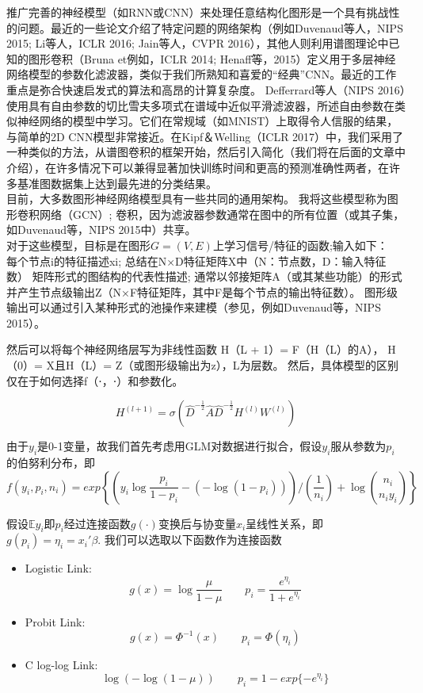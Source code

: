 \documentclass[a4paper,UTF8]{article}
\begin{document}
推广完善的神经模型（如RNN或CNN）来处理任意结构化图形是一个具有挑战性的问题。最近的一些论文介绍了特定问题的网络架构（例如Duvenaud等人，NIPS 2015; Li等人，ICLR 2016; Jain等人，CVPR 2016），其他人则利用谱图理论中已知的图形卷积（Bruna et例如，ICLR 2014; Henaff等，2015）定义用于多层神经网络模型的参数化滤波器，类似于我们所熟知和喜爱的“经典”CNN。最近的工作重点是弥合快速启发式的算法和高昂的计算复杂度。 Defferrard等人（NIPS 2016）使用具有自由参数的切比雪夫多项式在谱域中近似平滑滤波器，所述自由参数在类似神经网络的模型中学习。它们在常规域（如MNIST）上取得令人信服的结果，与简单的2D CNN模型非常接近。在Kipf＆Welling（ICLR 2017）中，我们采用了一种类似的方法，从谱图卷积的框架开始，然后引入简化（我们将在后面的文章中介绍），在许多情况下可以兼得显著加快训练时间和更高的预测准确性两者，在许多基准图数据集上达到最先进的分类结果。\\

目前，大多数图形神经网络模型具有一些共同的通用架构。 我将这些模型称为图形卷积网络（GCN）; 卷积，因为滤波器参数通常在图中的所有位置（或其子集，如Duvenaud等，NIPS 2015中）共享。\\

对于这些模型，目标是在图形$G=(V,E)$上学习信号/特征的函数;输入如下：\\

每个节点i的特征描述xi; 总结在N×D特征矩阵X中（N：节点数，D：输入特征数）
矩阵形式的图结构的代表性描述; 通常以邻接矩阵A（或其某些功能）的形式
并产生节点级输出Z（N×F特征矩阵，其中F是每个节点的输出特征数）。 图形级输出可以通过引入某种形式的池操作来建模（参见，例如Duvenaud等，NIPS 2015）。

然后可以将每个神经网络层写为非线性函数
H（L + 1）= F（H（L）的A），
H（0）= X且H（L）= Z（或图形级输出为z），L为层数。 然后，具体模型的区别仅在于如何选择f（⋅，⋅）和参数化。

\[ H^{(l+1)} = \sigma \left( \hat{D}^{-\frac{1}{2}} \hat{A} \hat{D}^{-\frac{1}{2}} H^{(l)}W^{(l)}\right)\]




由于$y_{i}$是0-1变量，故我们首先考虑用GLM对数据进行拟合，假设$y_{i}$服从参数为$p_{i}$的伯努利分布，即
$$f(y_i,p_i,n_i)=exp\left\{ \left(y_{i}\log \frac{p_{i}}{1-p_{i}} -\left(-\log (1-p_{i}) \right)\right)/\left(\frac{1}{n_i} \right)+\log \binom{n_i}{n_iy_{i}} \right\} $$ 

假设$\mathbb{E}y_{i}$即$p_{i}$经过连接函数$g(\cdot)$变换后与协变量$x_{i}$呈线性关系，即$ g(p_{i})=\eta_{i}=x_{i}'\beta  $.
我们可以选取以下函数作为连接函数
\begin{itemize}
	\item Logistic Link: $$g(x)=\log \frac{\mu}{1-\mu}\quad\quad p_{i}=\frac{e^{\eta_{i}}}{1+e^{\eta_{i}}} $$
	\item Probit Link: $$g(x)=\Phi^{-1}(x) \quad\quad p_{i}=\Phi(\eta_{i})  $$
	\item C log-log Link: $$\log(-\log(1-\mu)) \quad\quad p_{i}=1-exp\{  -e^{\eta_{i}}\}$$
\end{itemize}
\end{document}
